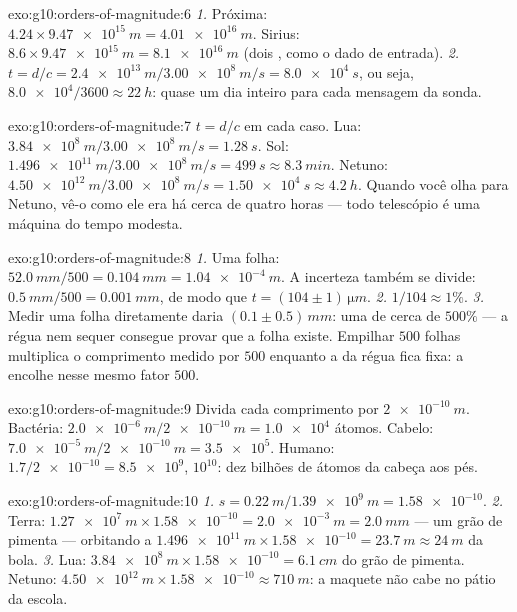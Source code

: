 \begin{solution}{exo:g10:orders-of-magnitude:6}
\emph{1.} Próxima: $4.24 \times \qty{9.47e15}{m} = \qty{4.01e16}{m}$.
Sirius: $8.6 \times \qty{9.47e15}{m} = \qty{8.1e16}{m}$ (dois , como o dado de entrada).
\emph{2.} $t = d/c = \qty{2.4e13}{m} / \qty{3.00e8}{m/s}
= \qty{8.0e4}{s}$, ou seja, $\num{8.0e4}/3600 \approx \qty{22}{h}$:
quase um dia inteiro para cada mensagem da sonda.
\end{solution}

\begin{solution}{exo:g10:orders-of-magnitude:7}
$t = d/c$ em cada caso. Lua:
$\qty{3.84e8}{m}/\qty{3.00e8}{m/s} = \qty{1.28}{s}$. Sol:
$\qty{1.496e11}{m}/\qty{3.00e8}{m/s} = \qty{499}{s} \approx
\qty{8.3}{min}$. Netuno:
$\qty{4.50e12}{m}/\qty{3.00e8}{m/s} = \qty{1.50e4}{s} \approx
\qty{4.2}{h}$. Quando você olha para Netuno, vê-o como ele era há cerca
de quatro horas --- todo telescópio é uma máquina do tempo modesta.
\end{solution}

\begin{solution}{exo:g10:orders-of-magnitude:8}
\emph{1.} Uma folha: $\qty{52.0}{mm}/500 = \qty{0.104}{mm}
= \qty{1.04e-4}{m}$. A incerteza também se divide:
$\qty{0.5}{mm}/500 = \qty{0.001}{mm}$, de modo que
$t = (104 \pm 1)\,\unit{\micro m}$.
\emph{2.} $1/104 \approx 1\%$.
\emph{3.} Medir uma folha diretamente daria
$(0.1 \pm 0.5)\,\unit{mm}$: uma  de cerca de $500\%$
--- a régua nem sequer consegue provar que a folha existe. Empilhar
$500$ folhas multiplica o comprimento medido por $500$ enquanto a
 da régua fica fixa: a  encolhe
nesse mesmo fator $500$.
\end{solution}

\begin{solution}{exo:g10:orders-of-magnitude:9}
Divida cada comprimento por $\qty{2e-10}{m}$. Bactéria:
$\qty{2.0e-6}{m}/\qty{2e-10}{m} = \num{1.0e4}$ átomos. Cabelo:
$\qty{7.0e-5}{m}/\qty{2e-10}{m} = \num{3.5e5}$. Humano:
$1.7/\num{2e-10} = \num{8.5e9}$,  $10^{10}$: dez
bilhões de átomos da cabeça aos pés.
\end{solution}

\begin{solution}{exo:g10:orders-of-magnitude:10}
\emph{1.} $s = \qty{0.22}{m}/\qty{1.39e9}{m} = \num{1.58e-10}$.
\emph{2.} Terra:
$\qty{1.27e7}{m} \times \num{1.58e-10} = \qty{2.0e-3}{m} =
\qty{2.0}{mm}$ --- um grão de pimenta --- orbitando a
$\qty{1.496e11}{m} \times \num{1.58e-10} = \qty{23.7}{m} \approx
\qty{24}{m}$ da bola.
\emph{3.} Lua: $\qty{3.84e8}{m} \times \num{1.58e-10} = \qty{6.1}{cm}$
do grão de pimenta. Netuno:
$\qty{4.50e12}{m} \times \num{1.58e-10} \approx \qty{710}{m}$: a maquete
não cabe no pátio da escola.
\end{solution}

